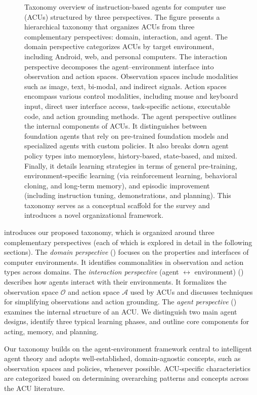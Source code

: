 \begin{figure}[p]
{    Taxonomy overview of instruction-based agents for computer use (ACUs) structured by three perspectives. The figure presents a hierarchical taxonomy that organizes ACUs from three complementary perspectives: domain, interaction, and agent. The domain perspective categorizes ACUs by target environment, including Android, web, and personal computers. The interaction perspective decomposes the agent–environment interface into observation and action spaces. Observation spaces include modalities such as image, text, bi-modal, and indirect signals. Action spaces encompass various control modalities, including mouse and keyboard input, direct user interface access, task-specific actions, executable code, and action grounding methods. The agent perspective outlines the internal components of ACUs. It distinguishes between foundation agents that rely on pre-trained foundation models and specialized agents with custom policies. It also breaks down agent policy types into memoryless, history-based, state-based, and mixed. Finally, it details learning strategies in terms of general pre-training, environment-specific learning (via reinforcement learning, behavioral cloning, and long-term memory), and episodic improvement (including instruction tuning, demonstrations, and planning). This taxonomy serves as a conceptual scaffold for the survey and introduces a novel organizational framework.
    }
    \label{fig:framework}
\end{figure}
%
 introduces our proposed taxonomy, which is organized around three complementary perspectives (each of which is explored in detail in the following sections).
The \emph{domain perspective} () focuses on the properties and interfaces of computer environments. It identifies commonalities in observation and action types across domains.
The \emph{interaction perspective} (agent $\leftrightarrow$ environment) () describes how agents interact with their environments. It formalizes the observation space $\mathcal{O}$ and action space $\mathcal{A}$ used by ACUs and discusses techniques for simplifying observations and action grounding.
The \emph{agent perspective} () examines the internal structure of an ACU. We distinguish two main agent designs, identify three typical learning phases, and outline core components for acting, memory, and planning.

Our taxonomy builds on the agent-environment framework central to intelligent agent theory \citep{russell_artificial_2022,sutton_reinforcement_2018} and adopts well-established, domain-agnostic concepts, such as observation spaces and policies, whenever possible.
ACU-specific characteristics are categorized based on determining overarching patterns and concepts across the ACU literature.

